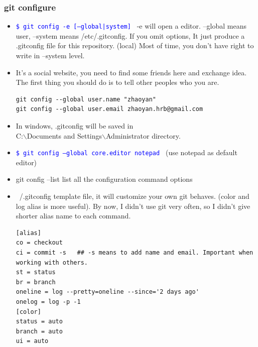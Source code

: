 \documentclass[a4paper,11pt,twoside]{book}
\newcommand{\linuxcommand}[1]{\texttt{\textcolor{blue}{\$ #1 \Pisymbol{psy}{191}}}}
\begin{document}
\subsubsection{git configure}
    \begin{itemize}

  \item \linuxcommand{git config -e [--global|system]}  -e will open a editor. --global means user, --system means /etc/.gitconfig.   If you omit options, It just produce a .gitconfig file for this repository. (local) Most of time, you don't have right to write in --system level. 

\item It's a social website, you need to find some friends here and exchange idea. The first thing you should do is to tell other peoples who you are.  
\begin{verbatim}
git config --global user.name "zhaoyan"
git config --global user.email zhaoyan.hrb@gmail.com
\end{verbatim}

    \item In windows, .gitconfig will be saved in  \\
    C:$\backslash$Documents and Settings$\backslash$Administrator directory.
    \item \linuxcommand{git config --global core.editor notepad} (use notepad as default editor)
    \item git config --list list all the configuration command options
 

\item  ~/.gitconfig template file, it will customize your own git behaves. (color and log alias is more useful). By now, I didn't use git very often, so I didn't give shorter alias name to each command.

\begin{verbatim}
[alias]
co = checkout
ci = commit -s   ## -s means to add name and email. Important when working with others.
st = status
br = branch
oneline = log --pretty=oneline --since='2 days ago'
onelog = log -p -1
[color]
status = auto
branch = auto
ui = auto
\end{verbatim}


\end{itemize}
\end{document}

